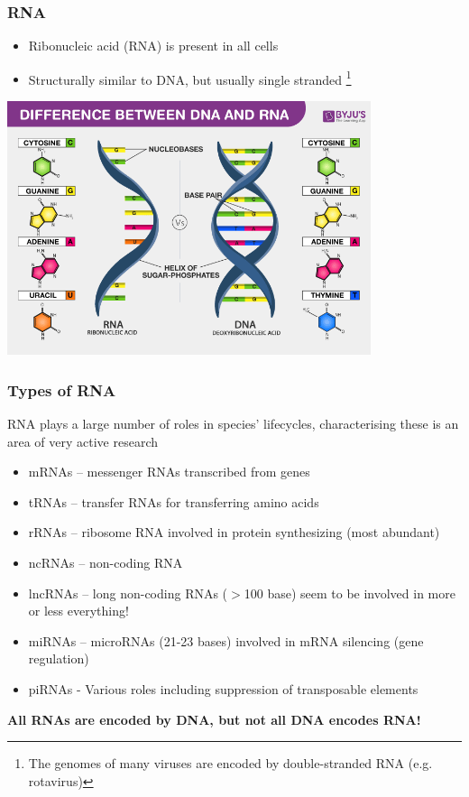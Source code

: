 \documentclass{beamer}
\newcommand\blfootnote[1]{%
	\begingroup
	\renewcommand\thefootnote{}\footnote{#1}%
	\addtocounter{footnote}{-1}%
	\endgroup
}
\begin{document}
\begin{frame}
	\frametitle{RNA}
	
	\begin{itemize}
		\item Ribonucleic acid (RNA) is present in all cells
		\item Structurally similar to DNA, but usually single stranded \blfootnote{The genomes of many viruses are encoded by double-stranded RNA (e.g. rotavirus)}
		
	\end{itemize}
			\centering	\includegraphics[keepaspectratio, width  = 0.8\textwidth]{img/rna_v_dna}\\
	
	
\end{frame}

\begin{frame}
\frametitle{Types of RNA}
	RNA plays a large number of roles in species' lifecycles, characterising these is an area of very active research\\
	
\vspace{20pt} 
	\scriptsize
	
	\begin{itemize}
\item mRNAs – messenger RNAs transcribed from genes
\item tRNAs – transfer RNAs for transferring amino acids
\item rRNAs – ribosome RNA involved in protein synthesizing (most abundant)
\item ncRNAs – non-coding RNA
\item lncRNAs – long non-coding RNAs ($>$100 base) seem to be involved in more or less everything!
\item miRNAs – microRNAs (21-23 bases) involved in mRNA silencing (gene regulation) 
\item piRNAs - Various roles including suppression of transposable elements
\end{itemize}
\vspace{20pt}
\textbf{All RNAs are encoded by DNA, but not all DNA encodes RNA!
}\end{frame}
\end{document}
